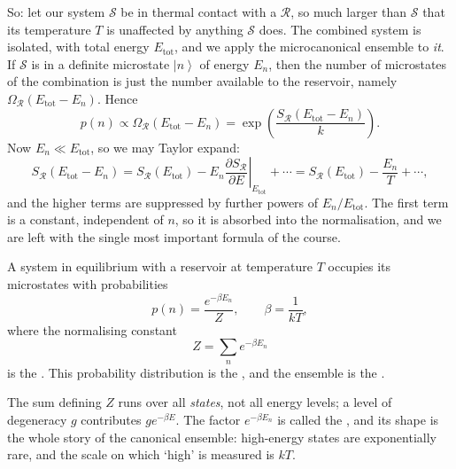 \documentclass[a4paper]{scrartcl}
\newcommand{\ket}[1]{\left| #1 \right\rangle}
\begin{document}
So: let our system $\mathcal S$ be in thermal contact with a  $\mathcal R$, so much larger than $\mathcal S$ that its temperature $T$ is unaffected by anything $\mathcal S$ does. The combined system is isolated, with total energy $E_{\mathrm{tot}}$, and we apply the microcanonical ensemble to \emph{it}. If $\mathcal S$ is in a definite microstate $\ket n$ of energy $E_n$, then the number of microstates of the combination is just the number available to the reservoir, namely $\Omega_{\mathcal R}(E_{\mathrm{tot}} - E_n)$. Hence
$$
p(n) \propto \Omega_{\mathcal R}(E_{\mathrm{tot}} - E_n) = \exp\left(\frac{S_{\mathcal R}(E_{\mathrm{tot}} - E_n)}{k}\right).
$$
Now $E_n \ll E_{\mathrm{tot}}$, so we may Taylor expand:
$$
S_{\mathcal R}(E_{\mathrm{tot}} - E_n) = S_{\mathcal R}(E_{\mathrm{tot}}) - E_n \left.\frac{\partial S_{\mathcal R}}{\partial E}\right|_{E_{\mathrm{tot}}} + \cdots = S_{\mathcal R}(E_{\mathrm{tot}}) - \frac{E_n}{T} + \cdots,
$$
and the higher terms are suppressed by further powers of $E_n/E_{\mathrm{tot}}$. The first term is a constant, independent of $n$, so it is absorbed into the normalisation, and we are left with the single most important formula of the course.

\begin{definition}
	A system in equilibrium with a reservoir at temperature $T$ occupies its microstates with probabilities
	$$
	p(n) = \frac{e^{-\beta E_n}}{Z}, \qquad \beta = \frac{1}{kT},
	$$
	where the normalising constant
	$$
	Z = \sum_n e^{-\beta E_n}
	$$
	is the . This probability distribution is the , and the ensemble is the .
\end{definition}

The sum defining $Z$ runs over all \emph{states}, not all energy levels; a level of degeneracy $g$ contributes $g e^{-\beta E}$. The factor $e^{-\beta E_n}$ is called the , and its shape is the whole story of the canonical ensemble: high-energy states are exponentially rare, and the scale on which `high' is measured is $kT$.
\end{document}
